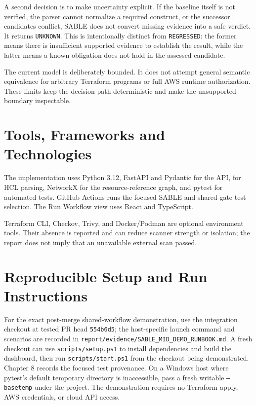 A second decision is to make uncertainty explicit. If the baseline itself is not verified, the parser cannot normalize a required construct, or the successor candidates conflict, SABLE does not convert missing evidence into a safe verdict. It returns \texttt{UNKNOWN}. This is intentionally distinct from \texttt{REGRESSED}: the former means there is insufficient supported evidence to establish the result, while the latter means a known obligation does not hold in the assessed candidate.

The current model is deliberately bounded. It does not attempt general semantic equivalence for arbitrary Terraform programs or full AWS runtime authorization. These limits keep the decision path deterministic and make the unsupported boundary inspectable.

\section{Tools, Frameworks and Technologies}

The implementation uses Python 3.12, FastAPI and Pydantic for the API,  for HCL parsing, NetworkX for the resource-reference graph, and pytest for automated tests. GitHub Actions runs the focused SABLE and shared-gate test selection. The Run Workflow view uses React and TypeScript.

Terraform CLI, Checkov, Trivy, and Docker/Podman are optional environment tools. Their absence is reported and can reduce scanner strength or isolation; the report does not imply that an unavailable external scan passed.

\section{Reproducible Setup and Run Instructions}
\begin{sloppypar}
For the exact post-merge shared-workflow demonstration, use the integration checkout at tested PR head \texttt{554b6d5}; the host-specific launch command and scenarios are recorded in \texttt{report/evidence/SABLE\_MID\_DEMO\_RUNBOOK.md}. A fresh checkout can use \texttt{scripts/setup.ps1} to install dependencies and build the dashboard, then run \texttt{scripts/start.ps1} from the checkout being demonstrated. Chapter 8 records the focused test provenance. On a Windows host where pytest's default temporary directory is inaccessible, pass a fresh writable \texttt{--basetemp} under the project. The demonstration requires no Terraform apply, AWS credentials, or cloud API access.
\end{sloppypar}

